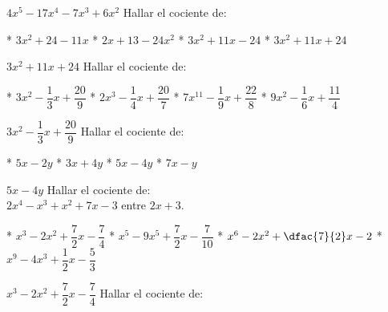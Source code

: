 $4x^5-17x^4-7x^3+6x^2$
Hallar el cociente de:
\begin{figure}[h]
\end{figure}
\begin{enum}
  * $3x^2+24-11x$
  * $2x+13-24x^2$
  * $3x^2+11x-24$
  * $3x^2+11x+24$
\end{enum}
$3x^2+11x+24$
Hallar el cociente de:
\begin{figure}[h]
\end{figure}
\begin{enum}
  * $3x^2-\dfrac{1}{3}x+\dfrac{20}{9}$
  * $2x^3-\dfrac{1}{4}x+\dfrac{20}{7}$
  * $7x^{11}-\dfrac{1}{9}x+\dfrac{22}{8}$
  * $9x^2-\dfrac{1}{6}x+\dfrac{11}{4}$
\end{enum}
$3x^2-\dfrac{1}{3}x+\dfrac{20}{9}$
Hallar el cociente de:
\begin{figure}[h]
\end{figure}
\begin{enum}
  * $5x-2y$
  * $3x+4y$
  * $5x-4y$
  * $7x-y$
\end{enum}
$5x-4y$
Hallar el cociente de: \\
$2x^4-x^3+x^2+7x-3$ entre $2x+3$.
\begin{enum}
  * $x^3-2x^2+\dfrac{7}{2}x-\dfrac{7}{4}$
  * $x^5-9x^5+\dfrac{7}{2}x-\dfrac{7}{10}$
  * $x^6-2x^2+\dfac{7}{2}x-2$
  * $x^9-4x^3+\dfrac{1}{2}x-\dfrac{5}{3}$
\end{enum}
$x^3-2x^2+\dfrac{7}{2}x-\dfrac{7}{4}$
Hallar el cociente de:
\begin{figure}[h]
\end{figure}
